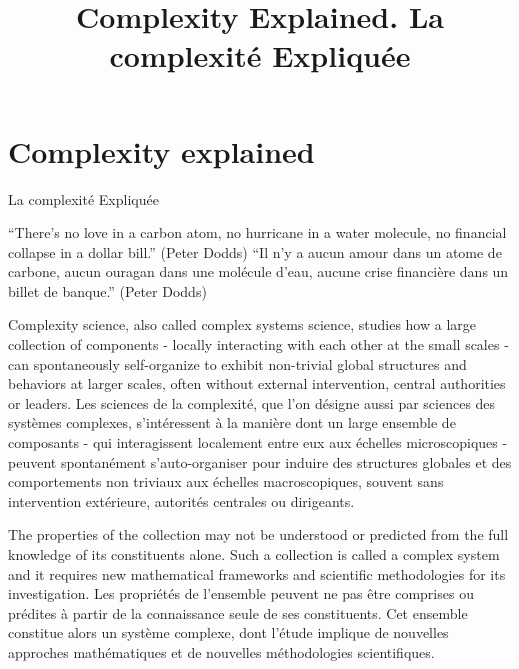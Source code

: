 \documentclass[12pt]{article}
\begin{document}
\title{Complexity Explained. La complexité Expliquée}
\date{}



\maketitle

\justify


\section*{Complexity explained}{La complexité Expliquée}

``There’s no love in a carbon atom, no hurricane in a water molecule, no financial collapse in a dollar bill.'' (Peter Dodds)
``Il n'y a aucun amour dans un atome de carbone, aucun ouragan dans une molécule d'eau, aucune crise financière dans un billet de banque.'' (Peter Dodds)


Complexity science, also called complex systems science, studies how a large collection of components - locally interacting with each other at the small scales - can spontaneously self-organize to exhibit non-trivial global structures and behaviors at larger scales, often without external intervention, central authorities or leaders.
Les sciences de la complexité, que l'on désigne aussi par sciences des systèmes complexes, s'intéressent à la manière dont un large ensemble de composants - qui interagissent localement entre eux aux échelles microscopiques - peuvent spontanément s'auto-organiser pour induire des structures globales et des comportements non triviaux aux échelles macroscopiques, souvent sans intervention extérieure, autorités centrales ou dirigeants.




The properties of the collection may not be understood or predicted from the full knowledge of its constituents alone. Such a collection is called a complex system and it requires new mathematical frameworks and scientific methodologies for its investigation.
Les propriétés de l'ensemble peuvent ne pas être comprises ou prédites à partir de la connaissance seule de ses constituents. Cet ensemble constitue alors un système complexe, dont l'étude implique de nouvelles approches mathématiques et de nouvelles méthodologies scientifiques.
\end{document}
